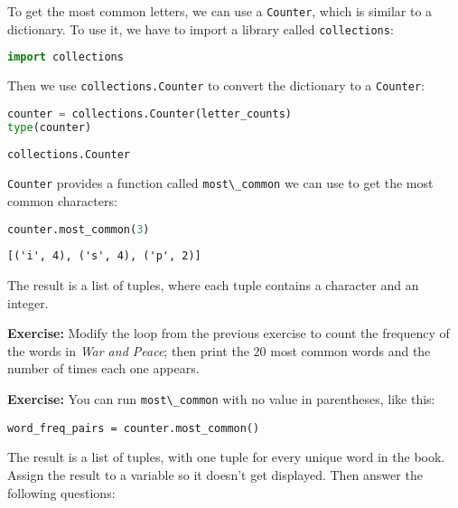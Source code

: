 To get the most common letters, we can use a
\passthrough{\lstinline!Counter!}, which is similar to a dictionary. To
use it, we have to import a library called
\passthrough{\lstinline!collections!}:

\begin{lstlisting}[language=Python,style=source]
import collections
\end{lstlisting}

Then we use \passthrough{\lstinline!collections.Counter!} to convert the
dictionary to a \passthrough{\lstinline!Counter!}:

\begin{lstlisting}[language=Python,style=source]
counter = collections.Counter(letter_counts)
type(counter)
\end{lstlisting}

\begin{lstlisting}[style=output]
collections.Counter
\end{lstlisting}

\passthrough{\lstinline!Counter!} provides a function called
\passthrough{\lstinline!most\_common!} we can use to get the most common
characters:

\begin{lstlisting}[language=Python,style=source]
counter.most_common(3)
\end{lstlisting}

\begin{lstlisting}[style=output]
[('i', 4), ('s', 4), ('p', 2)]
\end{lstlisting}

The result is a list of tuples, where each tuple contains a character
and an integer.

\textbf{Exercise:} Modify the loop from the previous exercise to count
the frequency of the words in \emph{War and Peace}; then print the 20
most common words and the number of times each one appears.

\textbf{Exercise:} You can run \passthrough{\lstinline!most\_common!}
with no value in parentheses, like this:

\begin{lstlisting}[style=output]
word_freq_pairs = counter.most_common()
\end{lstlisting}

The result is a list of tuples, with one tuple for every unique word in
the book. Assign the result to a variable so it doesn't get displayed.
Then answer the following questions:

